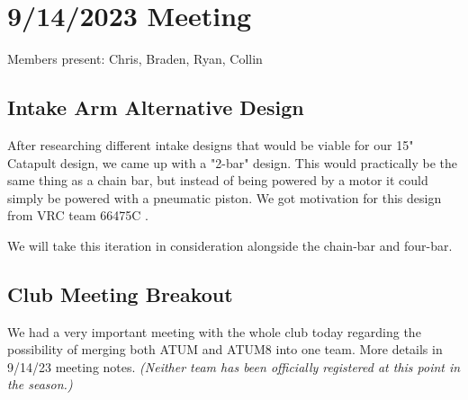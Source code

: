 \section{9/14/2023 Meeting}

Members present: Chris, Braden, Ryan, Collin

\subsection{Intake Arm Alternative Design}
After researching different intake designs that would be viable for our 15"
Catapult design, we came up with a "2-bar" design. This would practically be the
same thing as a chain bar, but instead of being powered by a motor it could
simply be powered with a pneumatic piston. We got motivation for this design
from VRC team 66475C \cite{bib:exmachinatwobar}.

We will take this iteration in consideration alongside the chain-bar and
four-bar.

\subsection{Club Meeting Breakout}
We had a very important meeting with the whole club today regarding the
possibility of merging both ATUM and ATUM8 into one team. More details in
9/14/23 meeting notes. \textit{(Neither team has been officially registered at
this point in the season.)}
